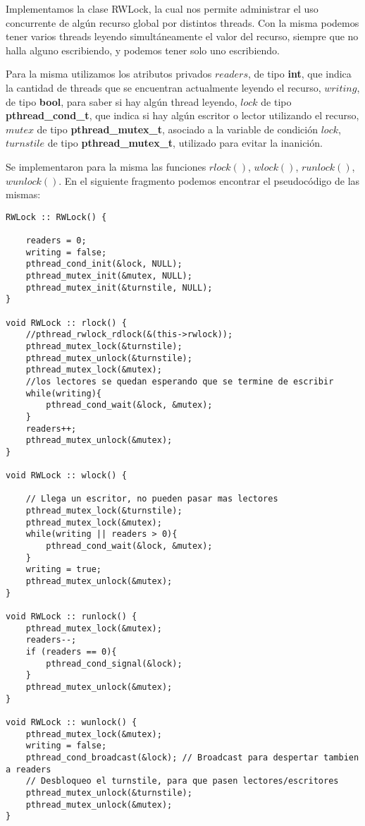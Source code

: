 Implementamos la clase RWLock, la cual nos permite administrar el uso concurrente de algún recurso global por distintos threads. Con la misma podemos tener varios threads leyendo simultáneamente el valor del recurso, siempre que no halla alguno escribiendo, y podemos tener solo uno escribiendo.

Para la misma utilizamos los atributos privados $ readers $, de tipo \textbf{int}, que indica la cantidad de threads que se encuentran actualmente leyendo el recurso, $ writing $, de tipo \textbf{bool}, para saber si  hay algún thread leyendo, $ lock $ de tipo \textbf{pthread_cond_t}, que indica si hay algún escritor o lector utilizando el recurso, $ mutex $ de tipo \textbf{pthread_mutex_t}, asociado a la variable de condición $ lock $, $ turnstile $ de tipo \textbf{pthread_mutex_t}, utilizado para evitar la inanición. 

Se implementaron para la misma las funciones $ rlock() $, $ wlock() $, $ runlock() $, $ wunlock() $. En el siguiente fragmento podemos encontrar el pseudocódigo de las mismas:

\begin{lstlisting}
RWLock :: RWLock() {

    readers = 0;
    writing = false;
    pthread_cond_init(&lock, NULL);
    pthread_mutex_init(&mutex, NULL);
    pthread_mutex_init(&turnstile, NULL);
}

void RWLock :: rlock() {
    //pthread_rwlock_rdlock(&(this->rwlock));
    pthread_mutex_lock(&turnstile);
    pthread_mutex_unlock(&turnstile);
    pthread_mutex_lock(&mutex);
    //los lectores se quedan esperando que se termine de escribir
    while(writing){
        pthread_cond_wait(&lock, &mutex);
    }
    readers++;
    pthread_mutex_unlock(&mutex);
}

void RWLock :: wlock() {

    // Llega un escritor, no pueden pasar mas lectores
    pthread_mutex_lock(&turnstile);
    pthread_mutex_lock(&mutex);
    while(writing || readers > 0){
        pthread_cond_wait(&lock, &mutex);
    }
    writing = true;
    pthread_mutex_unlock(&mutex);
}

void RWLock :: runlock() {
    pthread_mutex_lock(&mutex);
    readers--;
    if (readers == 0){
        pthread_cond_signal(&lock);
    }
    pthread_mutex_unlock(&mutex);
}

void RWLock :: wunlock() {
    pthread_mutex_lock(&mutex);
    writing = false;
    pthread_cond_broadcast(&lock); // Broadcast para despertar tambien a readers
    // Desbloqueo el turnstile, para que pasen lectores/escritores
    pthread_mutex_unlock(&turnstile);
    pthread_mutex_unlock(&mutex);
}
\end{lstlisting}


